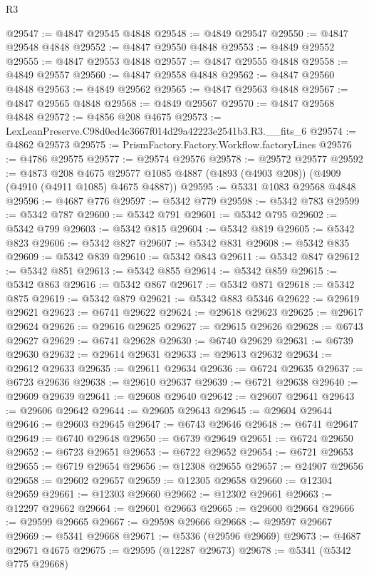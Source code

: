 \begin{lexlean}{R3}
\begin{coremodule}
@29547 := @4847 @29545 @4848
@29548 := @4849 @29547
@29550 := @4847 @29548 @4848
@29552 := @4847 @29550 @4848
@29553 := @4849 @29552
@29555 := @4847 @29553 @4848
@29557 := @4847 @29555 @4848
@29558 := @4849 @29557
@29560 := @4847 @29558 @4848
@29562 := @4847 @29560 @4848
@29563 := @4849 @29562
@29565 := @4847 @29563 @4848
@29567 := @4847 @29565 @4848
@29568 := @4849 @29567
@29570 := @4847 @29568 @4848
@29572 := @4856 @208 @4675
@29573 := LexLeanPreserve.C98d0ed4c3667f014d29a42223e2541b3.R3.__fits_6
@29574 := @4862 @29573
@29575 := PrismFactory.Factory.Workflow.factoryLines
@29576 := @4786 @29575
@29577 := @29574 @29576
@29578 := @29572 @29577
@29592 := @4873
    @208
    @4675
    @29577
    @1085
    @4887
    (@4893 (@4903 @208))
    (@4909 (@4910 (@4911 @1085) @4675 @4887))
@29595 := @5331 @1083 @29568 @4848
@29596 := @4687 @776
@29597 := @5342 @779
@29598 := @5342 @783
@29599 := @5342 @787
@29600 := @5342 @791
@29601 := @5342 @795
@29602 := @5342 @799
@29603 := @5342 @815
@29604 := @5342 @819
@29605 := @5342 @823
@29606 := @5342 @827
@29607 := @5342 @831
@29608 := @5342 @835
@29609 := @5342 @839
@29610 := @5342 @843
@29611 := @5342 @847
@29612 := @5342 @851
@29613 := @5342 @855
@29614 := @5342 @859
@29615 := @5342 @863
@29616 := @5342 @867
@29617 := @5342 @871
@29618 := @5342 @875
@29619 := @5342 @879
@29621 := @5342 @883 @5346
@29622 := @29619 @29621
@29623 := @6741 @29622
@29624 := @29618 @29623
@29625 := @29617 @29624
@29626 := @29616 @29625
@29627 := @29615 @29626
@29628 := @6743 @29627
@29629 := @6741 @29628
@29630 := @6740 @29629
@29631 := @6739 @29630
@29632 := @29614 @29631
@29633 := @29613 @29632
@29634 := @29612 @29633
@29635 := @29611 @29634
@29636 := @6724 @29635
@29637 := @6723 @29636
@29638 := @29610 @29637
@29639 := @6721 @29638
@29640 := @29609 @29639
@29641 := @29608 @29640
@29642 := @29607 @29641
@29643 := @29606 @29642
@29644 := @29605 @29643
@29645 := @29604 @29644
@29646 := @29603 @29645
@29647 := @6743 @29646
@29648 := @6741 @29647
@29649 := @6740 @29648
@29650 := @6739 @29649
@29651 := @6724 @29650
@29652 := @6723 @29651
@29653 := @6722 @29652
@29654 := @6721 @29653
@29655 := @6719 @29654
@29656 := @12308 @29655
@29657 := @24907 @29656
@29658 := @29602 @29657
@29659 := @12305 @29658
@29660 := @12304 @29659
@29661 := @12303 @29660
@29662 := @12302 @29661
@29663 := @12297 @29662
@29664 := @29601 @29663
@29665 := @29600 @29664
@29666 := @29599 @29665
@29667 := @29598 @29666
@29668 := @29597 @29667
@29669 := @5341 @29668
@29671 := @5336 (@29596 @29669)
@29673 := @4687 @29671 @4675
@29675 := @29595 (@12287 @29673)
@29678 := @5341 (@5342 @775 @29668)

\end{coremodule}
\end{lexlean}
